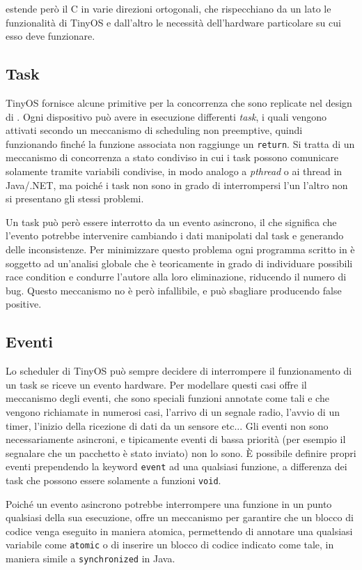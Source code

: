 \documentclass[twoside,11pt,a4paper,italian,openany]{book}
\begin{document}
\nesc estende però il C in varie direzioni ortogonali, che rispecchiano da un lato le 
funzionalità di TinyOS e dall'altro le necessità dell'hardware particolare su cui esso deve 
funzionare. 

\subsection{Task}
TinyOS fornisce alcune primitive per la concorrenza che sono replicate nel design di \nesc.
Ogni dispositivo può avere in esecuzione differenti \emph{task}, i quali vengono attivati 
secondo un meccanismo di scheduling non preemptive, quindi funzionando finché la funzione 
associata non raggiunge un \texttt{return}. 
Si tratta di un meccanismo di concorrenza a stato condiviso in cui 
i task possono comunicare solamente tramite variabili condivise, in modo analogo a 
\emph{pthread} o ai thread in Java/.NET,  ma poiché i task non sono in grado di 
interrompersi l'un l'altro non si presentano gli stessi problemi.

Un task può però essere interrotto da un evento asincrono, il che significa che l'evento 
potrebbe intervenire cambiando i dati manipolati dal task e generando delle inconsistenze.
Per minimizzare questo problema ogni programma scritto in  \nesc è soggetto ad 
un'analisi globale che è teoricamente in grado di individuare possibili race condition e 
condurre l'autore alla loro eliminazione, riducendo il numero di bug. 
Questo meccanismo no è però infallibile, e può sbagliare producendo false positive.


\subsection{Eventi}
Lo scheduler di TinyOS può sempre decidere di interrompere il funzionamento di un task 
se riceve un evento hardware. 
Per modellare questi casi \nesc offre il meccanismo degli eventi, 
che sono speciali funzioni annotate come tali e che vengono richiamate in numerosi 
casi, l'arrivo di un segnale radio, l'avvio di un timer, l'inizio della ricezione di dati da un sensore etc...
Gli eventi non sono necessariamente asincroni, e tipicamente eventi di bassa priorità (per esempio il segnalare che un pacchetto è stato inviato) non lo sono.
\`E possibile definire propri eventi prependendo la keyword \texttt{event} ad una qualsiasi 
funzione, a differenza dei task che possono essere solamente a funzioni \texttt{void}.

Poiché un evento asincrono potrebbe interrompere una funzione in un punto qualsiasi della sua esecuzione, \nesc offre un meccanismo per garantire che un blocco di codice venga eseguito in 
maniera atomica,  permettendo di annotare una qualsiasi variabile come \texttt{atomic} o 
di inserire un blocco di codice indicato come tale, in maniera simile a \texttt{synchronized} 
in Java.
\end{document}
